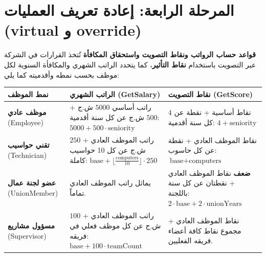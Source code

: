 \documentclass[14pt]{extarticle}
\begin{document}
\clearpage

\section*{المرحلة الرابعة: إعادة تعريف العمليات (\textenglish{virtual} و \textenglish{override})}

\textbf{قواعد حساب الرواتب ونقاط التصويت واستحقاق المكافأة}
تُتخذ القرارات في الشركة عبر التصويت باستخدام \textbf{نقاط التأثير}، كما يتحدد الراتب الشهري والمكافأة السنوية لكل موظف بحسب نمطه وأقدميته كما يلي:
\begin{center}
\renewcommand{\arraystretch}{1.4}
{\small
\begin{tabular}{|p{}|p{}|p{}|}
\hline
\textbf{نمط الموظف} & \textbf{الراتب الشهري (\textenglish{GetSalary})} & \textbf{نقاط التصويت (\textenglish{GetScore})} \\
\hline
\textbf{موظف عادي} \newline (\textenglish{Employee}) &
راتب أساسي $5000$ ش.ج + $500$ ش.ج عن كل سنة أقدمية: \newline
$5000 + 500 \cdot \text{seniority}$ &
$4$ نقاط أساسية + نقطة عن كل سنة أقدمية: \newline
$4 + \text{seniority}$ \\
\hline
\textbf{تقني حواسيب} \newline (\textenglish{Technician}) &
راتب الموظف العادي + $250$ ش.ج عن كل 10 حواسيب كاملة: \newline
$\text{base} + \lfloor \frac{\text{computers}}{10} \rfloor \cdot 250$ &
نقاط الموظف العادي + نقطة عن كل حاسوب: \newline
$\text{base} + \text{computers}$ \\
\hline
\textbf{عضو لجنة عمال} \newline (\textenglish{UnionMember}) &
يماثل راتب الموظف العادي تماماً. &
\textbf{ضعف} نقاط الموظف العادي + نقطتان عن كل سنة باللجنة: \newline
$2 \cdot \text{base} + 2 \cdot \text{unionYears}$ \\
\hline
\textbf{مسؤول مشاريع} \newline (\textenglish{Supervisor}) &
راتب الموظف العادي + $100$ ش.ج عن كل موظف فعلي في فريقه: \newline
$\text{base} + 100 \cdot \text{teamCount}$ &
نقاط الموظف العادي + مجموع نقاط كافة أعضاء فريقه الفعليين. \\
\hline
\end{tabular}
}
\end{center}
\end{document}
